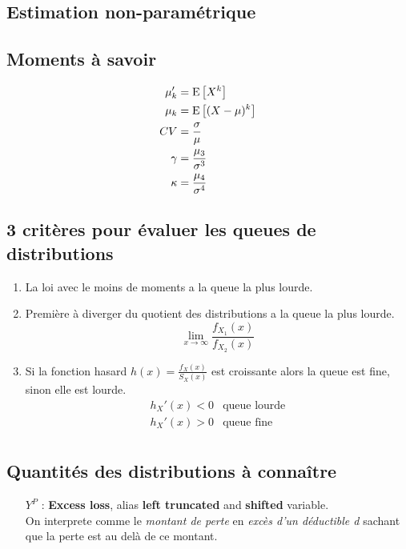 \documentclass[french, landscape]{article}
\begin{document}
\small
\begin{multicols*}{3} %

\setcounter{section}{2}
\section{Estimation non-paramétrique}
\subsection*{Moments à savoir}
\begin{align*}
\mu_k^{\prime} 	& = \mathrm{E} \left[ X^k \right] \\
\mu_k			& = \mathrm{E} \left[ (X-\mu)^k \right] \\
CV				& = \frac{\sigma}{\mu} \\
\gamma			& = \frac{\mu_3}{\sigma^3}  \\
\kappa			& = \frac{\mu_4}{\sigma^4} \\
\end{align*}

\subsection*{3 critères pour évaluer les queues de distributions}

\begin{enumerate}

\item La loi avec le moins de moments a la queue la plus lourde.
\item Première à diverger du quotient des distributions a la queue la plus lourde.
\[\lim_{x \to \infty} \frac{f_{X_1}(x)}{f_{X_2}(x)}\]
\item Si la fonction hasard $h(x) = \frac{f_X(x)}{S_X(x)}$ est croissante alors la queue est fine, sinon elle est lourde.
\[
\begin{matrix}
	h_X'(x) < 0 & \text{queue lourde} \\
	h_X'(x) > 0 & \text{queue fine} \\
\end{matrix}
\]
\end{enumerate}


\subsection*{Quantités des distributions à connaître}

\begin{itemize}
\item[$Y^P$ : ] 
	\textbf{Excess loss}, alias \textbf{left truncated} and \textbf{shifted} variable. \\
	On interprete comme le \textit{montant de perte} en \textit{excès d'un déductible d} sachant que la perte est au delà de ce montant.



\end{itemize}
\end{multicols*}
\end{document}

